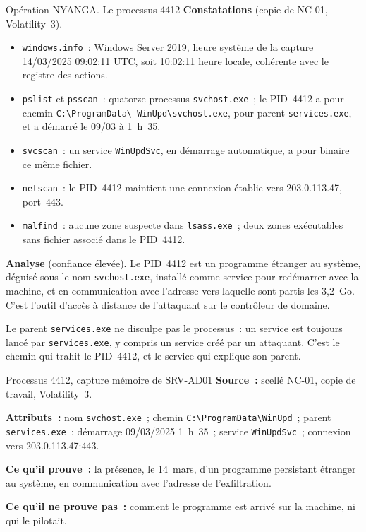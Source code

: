 \begin{boxscenario}{Opération NYANGA. Le processus 4412}
\textbf{Constatations} (copie de NC-01, Volatility~3).
\begin{itemize}
    \item \texttt{windows.info}~: Windows Server 2019, heure système de la
          capture 14/03/2025 09:02:11 UTC, soit 10:02:11 heure locale,
          cohérente avec le registre des actions.
    \item \texttt{pslist} et \texttt{psscan}~: quatorze processus
          \texttt{svchost.exe}~; le PID~4412 a pour chemin
          \texttt{C:\textbackslash ProgramData\textbackslash
          WinUpd\textbackslash svchost.exe}, pour parent
          \texttt{services.exe}, et a démarré le 09/03 à 1~h~35.
    \item \texttt{svcscan}~: un service \texttt{WinUpdSvc}, en démarrage
          automatique, a pour binaire ce même fichier.
    \item \texttt{netscan}~: le PID~4412 maintient une connexion établie vers
          203.0.113.47, port~443.
    \item \texttt{malfind}~: aucune zone suspecte dans \texttt{lsass.exe}~;
          deux zones exécutables sans fichier associé dans le PID~4412.
\end{itemize}

\textbf{Analyse} (confiance élevée). Le PID~4412 est un programme étranger
au système, déguisé sous le nom \texttt{svchost.exe}, installé comme service
pour redémarrer avec la machine, et en communication avec l'adresse vers
laquelle sont partis les 3,2~Go. C'est l'outil d'accès à distance de
l'attaquant sur le contrôleur de domaine.
\end{boxscenario}

Le parent \texttt{services.exe} ne disculpe pas le processus~: un service
est toujours lancé par \texttt{services.exe}, y compris un service créé par
un attaquant. C'est le chemin qui trahit le PID~4412, et le service qui
explique son parent.

\begin{boxobjet}{Processus 4412, capture mémoire de SRV-AD01}
\textbf{Source~:} scellé NC-01, copie de travail, Volatility~3.

\textbf{Attributs~:} nom \texttt{svchost.exe}~; chemin
\texttt{C:\textbackslash ProgramData\textbackslash WinUpd}~; parent
\texttt{services.exe}~; démarrage 09/03/2025 1~h~35~; service
\texttt{WinUpdSvc}~; connexion vers 203.0.113.47:443.

\textbf{Ce qu'il prouve~:} la présence, le 14~mars, d'un programme
persistant étranger au système, en communication avec l'adresse de
l'exfiltration.

\textbf{Ce qu'il ne prouve pas~:} comment le programme est arrivé sur la
machine, ni qui le pilotait.
\end{boxobjet}

